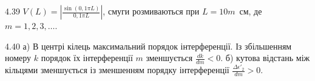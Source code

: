 \begin{Solution}{4.{39}}
	$V(L) = \left| \frac{\sin(0,1\pi L)}{0,1\pi L}\right|$, смуги розмиваються при $L = 10m$~см, де $m = 1, 2, 3, \ldots$.
\end{Solution}
\begin{Solution}{4.{40}}
	а) В центрі кілець максимальний порядок інтерференції. Із збільшенням номеру
	$k$ порядок їх інтерференції $ m $ зменшується $\frac{dk}{dm} < 0$. б) кутова відстань між кільцями зменшується із зменшенням порядку інтерференції  $\frac{\Delta \epsilon'_2}{dm} > 0 $.
\end{Solution}
